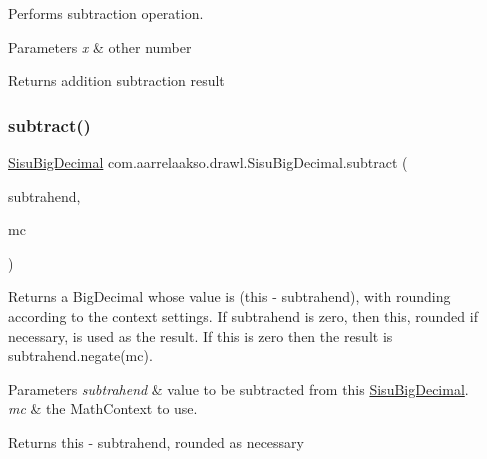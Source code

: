 Performs subtraction operation.


\begin{DoxyParams}{Parameters}
{\em x} & other number \\
\hline
\end{DoxyParams}
\begin{DoxyReturn}{Returns}
addition subtraction result 
\end{DoxyReturn}
\mbox{\label{classcom_1_1aarrelaakso_1_1drawl_1_1_sisu_big_decimal_a8a237e36134bf0cdb87c3b53b3aaa9cc}} 
\subsubsection{\texorpdfstring{subtract()}{subtract()}\hspace{0.1cm}{\footnotesize\ttfamily [2/3]}}
{\footnotesize\ttfamily \hyperlink{classcom_1_1aarrelaakso_1_1drawl_1_1_sisu_big_decimal}{Sisu\+Big\+Decimal} com.\+aarrelaakso.\+drawl.\+Sisu\+Big\+Decimal.\+subtract (\begin{DoxyParamCaption}\item[{\hyperlink{classcom_1_1aarrelaakso_1_1drawl_1_1_sisu_big_decimal}{Sisu\+Big\+Decimal}}]{subtrahend,  }\item[{Math\+Context}]{mc }\end{DoxyParamCaption})\hspace{0.3cm}{\ttfamily [protected]}}

Returns a Big\+Decimal whose value is (this -\/ subtrahend), with rounding according to the context settings. If subtrahend is zero, then this, rounded if necessary, is used as the result. If this is zero then the result is subtrahend.\+negate(mc).


\begin{DoxyParams}{Parameters}
{\em subtrahend} & value to be subtracted from this \hyperlink{classcom_1_1aarrelaakso_1_1drawl_1_1_sisu_big_decimal}{Sisu\+Big\+Decimal}. \\
\hline
{\em mc} & the Math\+Context to use. \\
\hline
\end{DoxyParams}
\begin{DoxyReturn}{Returns}
this -\/ subtrahend, rounded as necessary 
\end{DoxyReturn}

